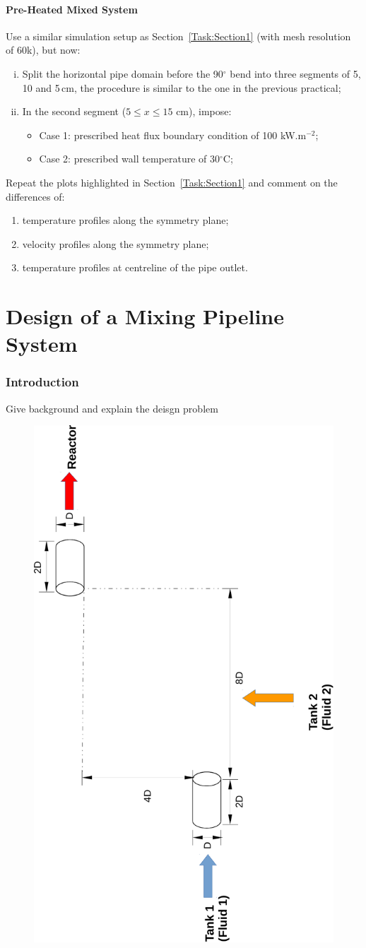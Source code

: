 \documentclass[12pts,a4paper,amsmath,amssymb,floatfix]{article}%
\begin{document}
\subsection{Pre-Heated Mixed System}
Use a similar simulation setup as Section~\ref{Task:Section1} (with mesh resolution of 60k), but now:
    \begin{enumerate}[i)]
       \item Split the horizontal pipe domain before the 90$^{\circ}$ bend into three segments of 5, 10 and 5\,cm, the procedure is similar to the one in the previous practical;
       \item In the second segment ($5\le x \le 15$ cm), impose:
       \begin{itemize}
          \item Case 1: prescribed heat flux boundary condition of 100 kW.m$^{-2}$;
          \item Case 2: prescribed wall temperature of 30$^{\circ}$C;
        \end{itemize}
    \end{enumerate}
    
    \begin{shaded}    
    Repeat the plots highlighted in Section~\ref{Task:Section1} and comment on the differences of:
    \begin{enumerate}
      \item temperature profiles along the symmetry plane;
      \item velocity profiles along the symmetry plane;
      \item temperature profiles at centreline of the pipe outlet.
    \end{enumerate}
    \end{shaded}

\clearpage

\part{Design of a Mixing Pipeline System}

\section{Introduction}
Give background and explain the deisgn problem

\begin{figure}[H] 
\includegraphics[height=.5\textwidth,clip]{./Pics/Design_1b}
\end{figure}
\end{document}
